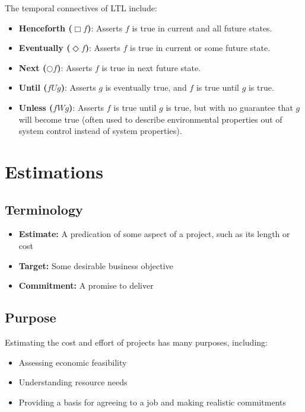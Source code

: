 \documentclass[12pt,titlepage]{article}
\let\stdsection\section
\renewcommand\section{\clearpage\stdsection}
\begin{document}
        The temporal connectives of LTL include:
        \begin{itemize}
          \item \textbf{Henceforth ($\Box f$)}: Asserts $f$ is true in current and all future states.
          \item \textbf{Eventually ($\Diamond f$)}: Asserts $f$ is true in current or some future state.
          \item \textbf{Next ($\Circle f$)}: Asserts $f$ is true in next future state.
          \item \textbf{Until ($f U g$)}: Asserts $g$ is eventually true, and $f$ is true until $g$ is true.
          \item \textbf{Unless ($f W g$)}: Asserts $f$ is true until $g$ is true, but with no guarantee that $g$ will become true (often used to describe environmental
            properties out of system control instead of system properties).
        \end{itemize}

  \section{Estimations}

    \subsection{Terminology}
      \begin{itemize}
        \item \textbf{Estimate:} A predication of some aspect of a project, such as its length or cost
        \item \textbf{Target:} Some desirable business objective
        \item \textbf{Commitment:} A promise to deliver
      \end{itemize}

    \subsection{Purpose}
      Estimating the cost and effort of projects has many purposes, including:
      \begin{itemize}
        \item Assessing economic feasibility
        \item Understanding resource needs
        \item Providing a basis for agreeing to a job and making realistic commitments
      \end{itemize}
\end{document}
